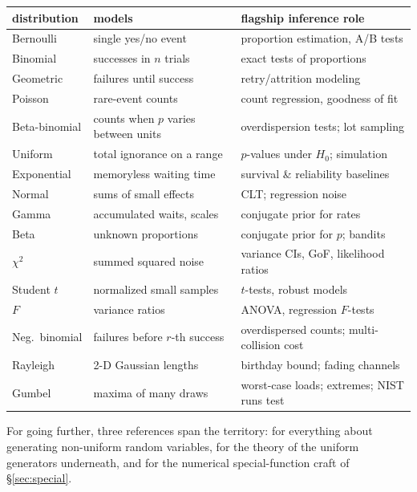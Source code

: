 \documentclass[11pt]{article}
\numberwithin{equation}{section}
\begin{document}
\begin{center}\small
\begin{tabular}{lll}
\toprule
distribution & models & flagship inference role \\
\midrule
Bernoulli   & single yes/no event        & proportion estimation, A/B tests \\
Binomial    & successes in $n$ trials    & exact tests of proportions \\
Geometric   & failures until success     & retry/attrition modeling \\
Poisson     & rare-event counts          & count regression, goodness of fit \\
Beta-binomial & counts when $p$ varies between units
  & overdispersion tests; lot sampling \\
Uniform     & total ignorance on a range & $p$-values under $H_0$; simulation \\
Exponential & memoryless waiting time    & survival \& reliability baselines \\
Normal      & sums of small effects      & CLT; regression noise \\
Gamma       & accumulated waits, scales  & conjugate prior for rates \\
Beta        & unknown proportions        & conjugate prior for $p$; bandits \\
$\chi^2$    & summed squared noise       & variance CIs, GoF, likelihood ratios \\
Student $t$ & normalized small samples   & $t$-tests, robust models \\
$F$         & variance ratios            & ANOVA, regression $F$-tests \\
\midrule
Neg.\ binomial & failures before $r$-th success & overdispersed counts;
  multi-collision cost \\
Rayleigh    & 2-D Gaussian lengths       & birthday bound; fading channels \\
Gumbel      & maxima of many draws       & worst-case loads; extremes;
  NIST runs test \\
\bottomrule
\end{tabular}
\end{center}

For going further, three references span the territory:
\citet{devroye1986} for everything about generating non-uniform random
variables, \citet{knuth1997} for the theory of the uniform generators
underneath, and \citet{press1992} for the numerical special-function
craft of \S\ref{sec:special}.



\end{document}
